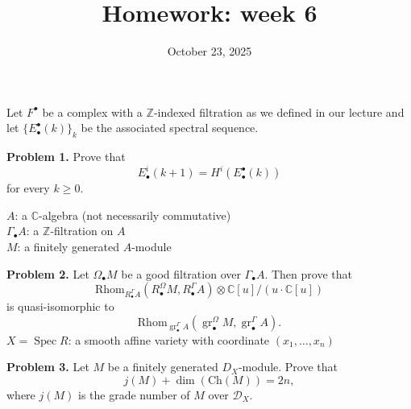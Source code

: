 \documentclass[12pt]{article}
\title{Homework: week 6}
\date{October 23, 2025}
\begin{document}
\maketitle

Let $F^\bullet$ be a complex with a $\mathbb{Z}$-indexed filtration as we defined in our lecture and let
$\{E^\bullet_\bullet(k)\}_k$ be the associated spectral sequence.

\bigskip
\noindent
\textbf{Problem 1.} Prove that
\[
    E^i_\bullet(k+1)=H^i(E^\bullet_\bullet(k))
\]
for every $k\ge 0$.

\bigskip
$A$: a $\mathbb{C}$-algebra (not necessarily commutative)\\
$\Gamma_\bullet A$: a $\mathbb{Z}$-filtration on $A$\\
$M$: a finitely generated $A$-module

\bigskip
\noindent
\textbf{Problem 2.} Let $\Omega_\bullet M$ be a good filtration over $\Gamma_\bullet A$. Then prove that
\[
    \mathrm{Rhom}_{R_\bullet^{\Gamma}A}\left(R_\bullet^{\Omega}M,R_\bullet^{\Gamma}A\right)\otimes \mathbb{C}[u]/(u\cdot\mathbb{C}[u])
\]
is quasi-isomorphic to
\[
    \mathrm{Rhom}_{\operatorname{gr}_\bullet^{\Gamma}A}(\operatorname{gr}_\bullet^{\Omega}M,\operatorname{gr}_\bullet^{\Gamma}A).
\]
$X=\operatorname{Spec}R$: a smooth affine variety with coordinate $(x_1,\ldots,x_n)$

\bigskip
\noindent
\textbf{Problem 3.} Let $M$ be a finitely generated $D_X$-module. Prove that
\[
    j(M)+\dim(\mathrm{Ch}(M))=2n,
\]
where $j(M)$ is the grade number of $M$ over $\mathcal{D}_X$.
\end{document}
